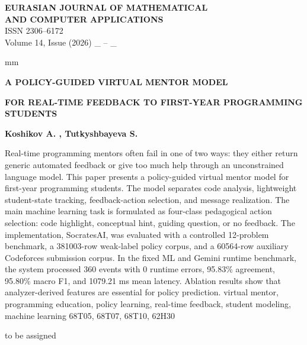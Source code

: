 \documentclass[twoside, 11pt]{article}
\begin{document}
\makeatletter
\def\@evenhead{\vbox{\hbox to \textwidth{\thepage\leftmark}\strut\newline\hrule}}
\def\@oddhead{\raisebox{0pt}[\headheight][0pt]{%
\vbox{\hbox to \textwidth{\rightmark\thepage\strut}\hrule}}}
\makeatother

\newpage
\normalsize
\def\bibname{\vspace*{-30mm}{\centerline{\normalsize References}}}
\thispagestyle{empty}
\begin{flushleft}
{\small {\bf EURASIAN JOURNAL OF MATHEMATICAL \\ AND COMPUTER APPLICATIONS}\\
ISSN 2306--6172\\
Volume 14, Issue (2026) \_ -- \_}
\end{flushleft}
 mm

\centerline{\bf A POLICY-GUIDED VIRTUAL MENTOR MODEL}
\centerline{\bf FOR REAL-TIME FEEDBACK TO FIRST-YEAR PROGRAMMING STUDENTS}

\vskip 0.2cm
\centerline{\bf Koshikov A. , Tutkyshbayeva S. }

\vskip 0.2cm
{\small
Real-time programming mentors often fail in one of two ways: they either return generic automated feedback or give too much help through an unconstrained language model. This paper presents a policy-guided virtual mentor model for first-year programming students. The model separates code analysis, lightweight student-state tracking, feedback-action selection, and message realization. The main machine learning task is formulated as four-class pedagogical action selection: code highlight, conceptual hint, guiding question, or no feedback. The implementation, SocratesAI, was evaluated with a controlled 12-problem benchmark, a 381003-row weak-label policy corpus, and a 60564-row auxiliary Codeforces submission corpus. In the fixed ML and Gemini runtime benchmark, the system processed 360 events with 0 runtime errors, 95.83\% agreement, 95.80\% macro F1, and 1079.21 ms mean latency. Ablation results show that analyzer-derived features are essential for policy prediction.
\vskip 0.2cm
 virtual mentor, programming education, policy learning, real-time feedback, student modeling, machine learning
\vskip 0.2cm
 68T05, 68T07, 68T10, 62H30}

\vskip 0.2cm
 to be assigned
\vskip 0.3cm
\setcounter{figure}{0}
\end{document}
